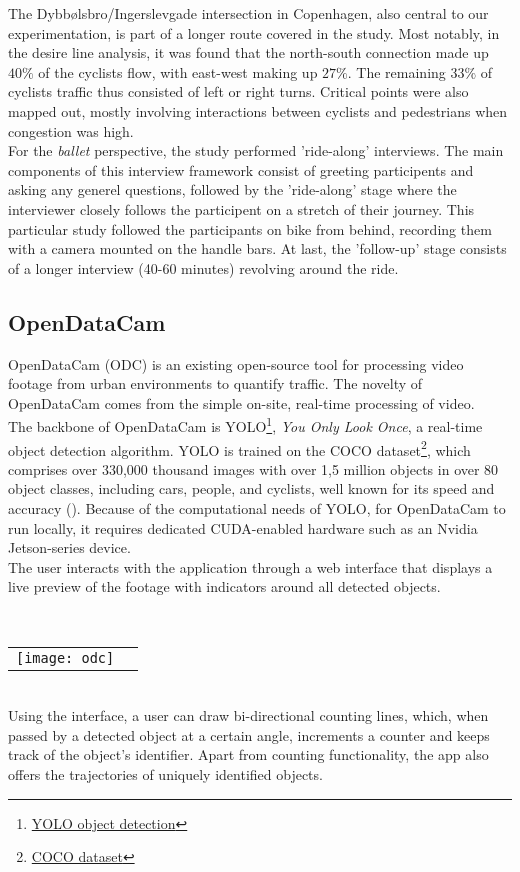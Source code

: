 The Dybbølsbro/Ingerslevgade intersection in Copenhagen, also central to our experimentation, is part of a longer route covered in the study.
Most notably, in the desire line analysis, it was found that the north-south connection made up $40\%$ of the cyclists flow, with east-west making up
$27\%$. The remaining $33\%$ of cyclists traffic thus consisted of left or right turns.
Critical points were also mapped out, mostly involving interactions between cyclists and pedestrians when congestion was high.
\ \\

For the \textit{ballet} perspective, the study performed 'ride-along' interviews. The main components of this interview framework 
consist of greeting participents and asking any generel questions, followed by the 'ride-along' stage where the interviewer closely follows 
the participent on a stretch of their journey. This particular study followed the participants on bike from behind, recording them with a 
camera mounted on the handle bars. At last, the 'follow-up' stage consists of a longer interview (40-60 minutes) revolving around the ride.

\subsection{OpenDataCam}
OpenDataCam (ODC) is an existing open-source tool for processing video footage from urban environments to quantify
traffic. The novelty of OpenDataCam comes from the simple on-site, real-time processing of video. 
\ \\

The backbone of OpenDataCam is YOLO\footnote{\href{https://pjreddie.com/darknet/yolo/}{YOLO object detection}}, \textit{You Only Look Once}, a real-time object detection algorithm. 
YOLO is trained on the COCO dataset\footnote{\href{https://cocodataset.org}{COCO dataset}}, which comprises over 330,000 thousand images
with over 1,5 million objects in over 80 object classes, including cars, people, and cyclists, well known for its speed and accuracy (\cite{redmon2016look}). 
Because of the computational needs of YOLO, for OpenDataCam to run locally, it requires dedicated CUDA-enabled hardware such as an Nvidia Jetson-series device. 
\ \\

The user interacts with the application through a web interface that displays a live preview of the footage with
indicators around all detected objects.

\ \\
\raggedbottom
\noindent
\begin{tabular}{@{}cc}
\texttt{[image: odc]} 
\end{tabular}
\ \\

Using the interface, a user can draw bi-directional counting lines, which, when passed by a detected object at a certain angle, 
increments a counter and keeps track of the object's identifier. Apart from counting functionality, the app also offers the trajectories of uniquely identified objects. 

\raggedbottom